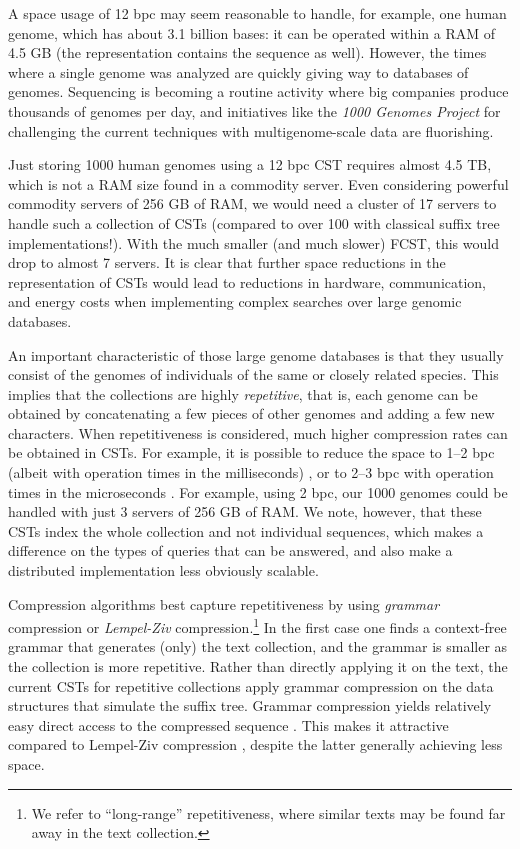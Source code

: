 \documentclass[a4paper,11pt]{llncs}
\begin{document}
A space usage of 12 bpc may seem reasonable to handle, for example, one human
genome, which has about 3.1 billion bases: it can be operated within a
RAM of 4.5 GB (the representation contains the sequence as well). However, the
times where a single genome was analyzed are quickly giving way to databases
of genomes. Sequencing is becoming a routine activity where big companies 
produce thousands of genomes per day, and initiatives like the {\em 1000 Genomes
Project} \cite{Rozowsky2011} for challenging the current techniques with
multigenome-scale data are fluorishing.

Just storing 1000 human genomes using a 12 bpc CST requires almost 4.5 TB, which
is not a RAM size found in a commodity server. Even considering powerful 
commodity servers of 256 GB of RAM, we would need a cluster of 17 servers to 
handle such a collection of CSTs (compared to over 100 with classical suffix
tree implementations!). With the much smaller (and much slower) FCST, this would
drop to almost 7 servers. It is clear that further space reductions in the 
representation of CSTs would lead to reductions in hardware, communication, 
and energy costs when implementing complex searches over large genomic 
databases.

An important characteristic of those large genome databases is that they 
usually consist of the genomes of individuals of the same or closely related
species. This implies that the collections are highly {\em repetitive}, that
is, each genome can be obtained by concatenating a few pieces of other genomes
and adding a few new characters. When repetitiveness is considered, much higher
compression rates can be obtained in CSTs. For example, it is possible to reduce
the space to 1--2 bpc (albeit with operation times in the milliseconds)
\cite{Abeliuk2013}, or to 2--3 bpc with operation times in the microseconds
\cite{Navarro2014}. For example, using 2 bpc, our 1000 genomes could be handled
with just 3 servers of 256 GB of RAM. We note, however, that these CSTs index
the whole collection and not individual sequences, which makes a difference on
the types of queries that can be answered, and also make a distributed 
implementation less obviously scalable.

Compression algorithms best capture repetitiveness by using {\em grammar}
compression or {\em Lempel-Ziv} compression.\footnote{We refer to ``long-range''
repetitiveness, where similar texts may be found far away in the text
collection.} In the first case \cite{KY00,CLLPPSS05} one finds a context-free 
grammar that generates (only) the text collection, and the grammar is smaller 
as the collection is more repetitive. Rather than directly applying it on the 
text, the current CSTs for repetitive collections \cite{Abeliuk2013,Navarro2014}
apply grammar compression on the data structures that simulate the suffix tree.
Grammar compression yields relatively easy direct access to the compressed 
sequence \cite{BLRSRW15}. This makes it attractive compared to Lempel-Ziv 
compression \cite{ZL77}, despite the latter generally achieving less space.
\end{document}
